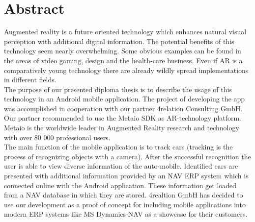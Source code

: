 \chapter*{Abstract}

Augmented reality is a future oriented technology which enhances natural visual perception with additional digital information. The potential benefits of this technology seem nearly overwhelming. Some obvious examples can be found in the areas of video gaming, design and the health-care business. Even if AR is a comparatively young technology there are already wildly spread implementations in different fields.          
\\

The purpose of our presented diploma thesis is to describe the usage of this technology in an Android mobile application. The project of developing the app was accomplished in cooperation with our partner 4relation Consulting GmbH. Our partner recommended to use the Metaio SDK as AR-technology platform. Metaio is the worldwide leader in Augmented Reality research and technology with over 80 000 professional users.
\\

The main function of the mobile application is to track cars (tracking is the process of recognizing objects with a camera). After the successful recognition the user is able to view diverse information of the auto-mobile. Identified cars are presented with additional information provided by an NAV ERP system which is connected online with the Android application. These information get loaded from a NAV database in which they are stored. 4realtion GmbH has decided to use our development as a proof of concept for including mobile applications into modern ERP systems like MS Dynamics-NAV as a showcase for their customers. 